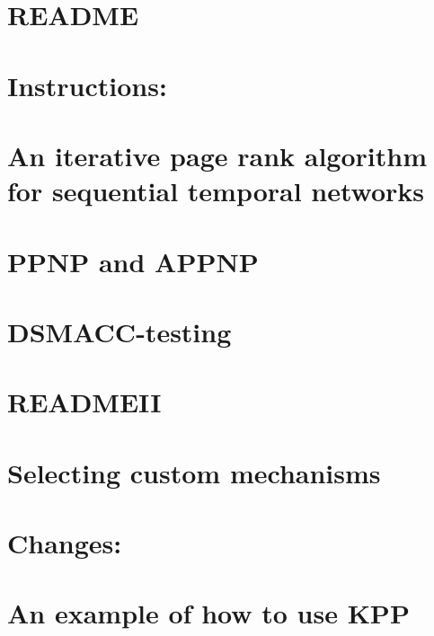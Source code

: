\documentclass[twoside]{book}
\newcommand{\+}{\discretionary{\mbox{\scriptsize$\hookleftarrow$}}{}{}}
\begin{document}
\chapter{R\+E\+A\+D\+ME}
\label{md_mechanisms_useful_README}

\chapter{Instructions\+:}
\label{md_MechLump_README}

\chapter{An iterative page rank algorithm for sequential temporal networks}
\label{md_Other_IterativeTemporalPageRank_README}

\chapter{P\+P\+NP and A\+P\+P\+NP}
\label{md_Other_ppnp_README}

\chapter{D\+S\+M\+A\+C\+C-\/testing}
\label{md_README}

\chapter{R\+E\+A\+D\+M\+E\+II}
\label{md_READMEII}

\chapter{Selecting custom mechanisms}
\label{md_src_docs_advancedrunning}

\chapter{Changes\+:}
\label{md_src_docs_changes}

\chapter{An example of how to use K\+PP}
\label{md_src_docs_compile}

\end{document}
